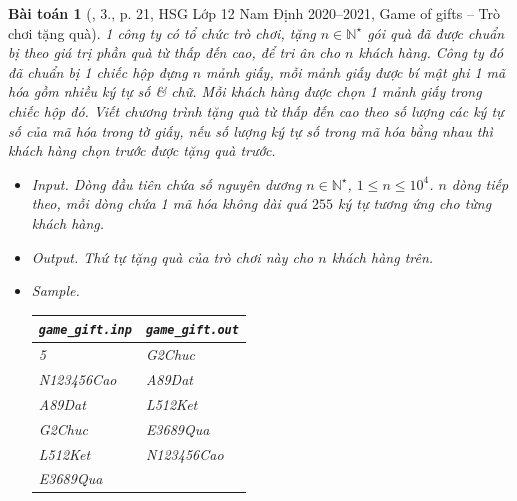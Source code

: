 \documentclass{article}
\newtheorem{baitoan}{Bài toán}
\begin{document}
\begin{baitoan}[\cite{Trung_HSG_THPT_Tin}, 3., p. 21, HSG Lớp 12 Nam Định 2020--2021, Game of gifts -- Trò chơi tặng quà]
	1 công ty có tổ chức trò chơi, tặng $n\in\mathbb{N}^\star$ gói quà đã được chuẩn bị theo giá trị phần quà từ thấp đến cao, để tri ân cho $n$ khách hàng. Công ty đó đã chuẩn bị 1 chiếc hộp đựng $n$ mảnh giấy, mỗi mảnh giấy được bí mật ghi 1 mã hóa gồm nhiều ký tự số \& chữ. Mỗi khách hàng được chọn 1 mảnh giấy trong chiếc hộp đó. Viết chương trình tặng quà từ thấp đến cao theo số lượng các ký tự số của mã hóa trong tờ giấy, nếu số lượng ký tự số trong mã hóa bằng nhau thì khách hàng chọn trước được tặng quà trước.
	\begin{itemize}
		\item {\sf Input.} Dòng đầu tiên chứa số nguyên dương $n\in\mathbb{N}^\star$, $1\le n\le10^4$. $n$ dòng tiếp theo, mỗi dòng chứa 1 mã hóa không dài quá $255$ ký tự tương ứng cho từng khách hàng.
		\item {\sf Output.} Thứ tự tặng quà của trò chơi này cho $n$ khách hàng trên.
		\item {\sf Sample.}
		\begin{table}[H]
			\centering
			\begin{tabular}{|l|l|}
				\hline
				\verb|game_gift.inp| & \verb|game_gift.out| \\
				\hline
				5 & G2Chuc \\
				N123456Cao & A89Dat \\
				A89Dat & L512Ket \\
				G2Chuc & E3689Qua \\
				L512Ket & N123456Cao \\
				E3689Qua &  \\
				\hline
			\end{tabular}
		\end{table}
	\end{itemize}
\end{baitoan}
\end{document}
